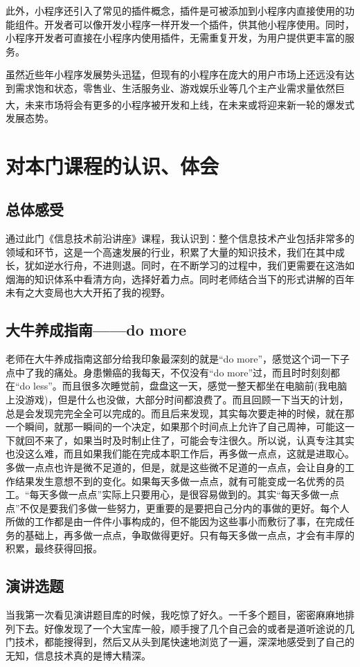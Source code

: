 \documentclass{article}
\begin{document}
此外，小程序还引入了常见的插件概念，插件是可被添加到小程序内直接使用的功能组件。开发者可以像开发小程序一样开发一个插件，供其他小程序使用。同时，小程序开发者可直接在小程序内使用插件，无需重复开发，为用户提供更丰富的服务。\par
虽然近些年小程序发展势头迅猛，但现有的小程序在庞大的用户市场上还远没有达到需求饱和状态，零售业、生活服务业、游戏娱乐业等几个主产业需求量依然巨大\textsuperscript{\citep{xcxxvqiu}}，未来市场将会有更多的小程序被开发和上线，在未来或将迎来新一轮的爆发式发展态势。
\section{对本门课程的认识、体会}
\subsection{总体感受}
通过此门《信息技术前沿讲座》课程，我认识到：整个信息技术产业包括非常多的领域和环节，这是一个高速发展的行业，积累了大量的知识技术，我们在其中成长，犹如逆水行舟，不进则退。同时，在不断学习的过程中，我们更需要在这浩如烟海的知识体系中看清方向，选择好着力点。同时老师结合当下的形式讲解的百年未有之大变局也大大开拓了我的视野。
\par
\subsection{大牛养成指南——do more}
老师在大牛养成指南这部分给我印象最深刻的就是“do more”，感觉这个词一下子点中了我的痛处。身患懒癌的我每天，不仅没有“do more”过，而且时时刻刻都在“do less”。而且很多次睡觉前，盘盘这一天，感觉一整天都坐在电脑前(我电脑上没游戏)，但是什么也没做，大部分时间都浪费了。而且回顾一下当天的计划，总是会发现完完全全可以完成的。而且后来发现，其实每次要走神的时候，就在那一个瞬间，就那一瞬间的一个决定，如果那个时间点上允许了自己周神，可能这一下就回不来了，如果当时及时制止住了，可能会专注很久。所以说，认真专注其实也没这么难，而且如果我们能在完成本职工作后，再多做一点点，这就是进取心。多做一点点也许是微不足道的，但是，就是这些微不足道的一点点，会让自身的工作结果发生意想不到的变化。如果每天多做一点点，就有可能变成一名优秀的员工。“每天多做一点点”实际上只要用心，是很容易做到的。其实“每天多做一点点”不仅是要我们多做一些努力，更重要的是要把自己分内的事做的更好。每个人所做的工作都是由一件件小事构成的，但不能因为这些事小而敷衍了事，在完成任务的基础上，再多做一点点，争取做得更好。只有每天多做一点点，才会有丰厚的积累，最终获得回报。
\subsection{演讲选题}
当我第一次看见演讲题目库的时候，我吃惊了好久。一千多个题目，密密麻麻地排列下去。好像发现了一个大宝库一般，顺手搜了几个自己会的或者是道听途说的几门技术，都能搜得到，然后又从头到尾快速地浏览了一遍，深深地感受到了自己的无知，信息技术真的是博大精深。
\end{document}
